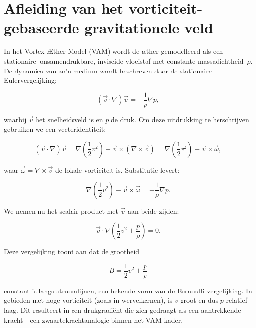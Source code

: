
\section{Afleiding van het vorticiteit-gebaseerde gravitationele veld}\label{sec:appendix_2}

In het Vortex Æther Model (VAM) wordt de æther gemodelleerd als een stationaire, onsamendrukbare, inviscide vloeistof met constante massadichtheid~$\rho$. De dynamica van zo'n medium wordt beschreven door de stationaire Eulervergelijking:

\begin{equation}
(\vec{v} \cdot \nabla)\vec{v} = -\frac{1}{\rho} \nabla p,
\end{equation}

waarbij $\vec{v}$ het snelheidsveld is en $p$ de druk. Om deze uitdrukking te herschrijven gebruiken we een vectoridentiteit:

\begin{equation}
(\vec{v} \cdot \nabla)\vec{v} = \nabla\left(\frac{1}{2}v^2\right) - \vec{v} \times (\nabla \times \vec{v}) = \nabla\left(\frac{1}{2}v^2\right) - \vec{v} \times \vec{\omega},
\end{equation}

waar $\vec{\omega} = \nabla \times \vec{v}$ de lokale vorticiteit is. Substitutie levert:

\begin{equation}
\nabla\left(\frac{1}{2}v^2\right) - \vec{v} \times \vec{\omega} = -\frac{1}{\rho} \nabla p.
\end{equation}

We nemen nu het scalair product met $\vec{v}$ aan beide zijden:

\begin{equation}
\vec{v} \cdot \nabla\left(\frac{1}{2}v^2 + \frac{p}{\rho}\right) = 0.
\end{equation}

Deze vergelijking toont aan dat de grootheid

\begin{equation}
B = \frac{1}{2}v^2 + \frac{p}{\rho}
\end{equation}

constant is langs stroomlijnen, een bekende vorm van de Bernoulli-vergelijking. In gebieden met hoge vorticiteit (zoals in wervelkernen), is $v$ groot en dus $p$ relatief laag. Dit resulteert in een drukgradiënt die zich gedraagt als een aantrekkende kracht—een zwaartekrachtanalogie binnen het VAM-kader.

